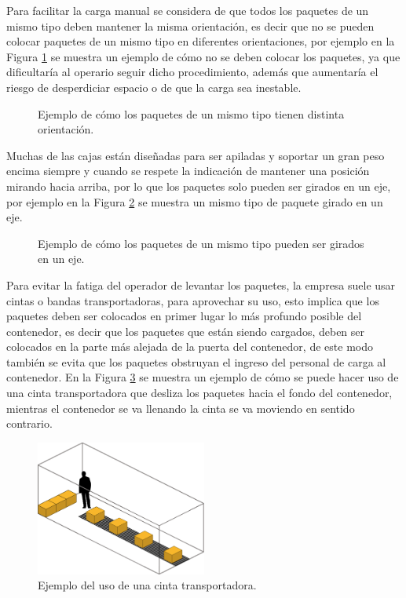 \documentclass[openany]{article}
\begin{document}
Para facilitar la carga manual se considera de que todos los paquetes de un mismo tipo deben mantener la misma orientación, es decir que no se pueden colocar paquetes de un mismo tipo en diferentes orientaciones, por ejemplo en la Figura \ref{fig:paquetes_mal_orientados} se muestra un ejemplo de cómo no se deben colocar los paquetes, ya que dificultaría al operario seguir dicho procedimiento, además que aumentaría el riesgo de desperdiciar espacio o de que la carga sea inestable.

\begin{figure}[H]
    \centering
    
    \caption{Ejemplo de cómo los paquetes de un mismo tipo tienen distinta orientación.}
    \label{fig:paquetes_mal_orientados}
\end{figure}

Muchas de las cajas están diseñadas para ser apiladas y soportar un gran peso encima siempre y cuando se respete la indicación de mantener una posición mirando hacia arriba, por lo que los paquetes solo pueden ser girados en un eje, por ejemplo en la Figura \ref{fig:paquetes_girados} se muestra un mismo tipo de paquete girado en un eje.

\begin{figure}[H]
    \centering
    
    \caption{Ejemplo de cómo los paquetes de un mismo tipo pueden ser girados en un eje.}
    \label{fig:paquetes_girados}
\end{figure}

Para evitar la fatiga del operador de levantar los paquetes, la empresa suele usar cintas o bandas transportadoras, para aprovechar su uso, esto implica que los paquetes deben ser colocados en primer lugar lo más profundo posible del contenedor, es decir que los paquetes que están siendo cargados, deben ser colocados en la parte más alejada de la puerta del contenedor, de este modo también se evita que los paquetes obstruyan el ingreso del personal de carga al contenedor. En la Figura \ref{fig:cinta_transportadora} se muestra un ejemplo de cómo se puede hacer uso de una cinta transportadora que desliza los paquetes hacia el fondo del contenedor, mientras el contenedor se va llenando la cinta se va moviendo en sentido contrario.

\begin{figure}[H]
    \centering
    \includegraphics[width=0.5\textwidth]{Figures/cinta_transportadora.eps}
    \caption{Ejemplo del uso de una cinta transportadora.}
    \label{fig:cinta_transportadora}
\end{figure}
\end{document}
